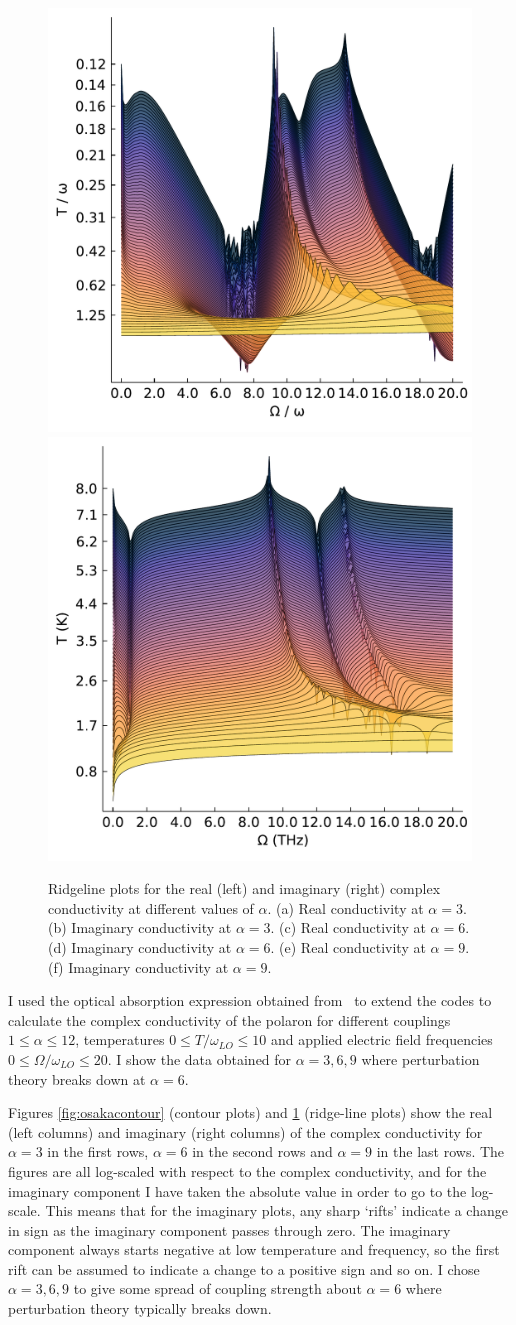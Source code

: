 \begin{figure}[p]
    \includegraphics[width=.49\textwidth]{figures/conductivity_plot_temp_real_9.pdf}
    \includegraphics[width=.49\textwidth]{figures/conductivity_plot_temp_imag_9.pdf}

    \caption{Ridgeline plots for the real (left) and imaginary (right) complex conductivity at different values of $\alpha$. (a) Real conductivity at $\alpha = 3$. (b) Imaginary conductivity at $\alpha = 3$. (c) Real conductivity at $\alpha = 6$. (d) Imaginary conductivity at $\alpha = 6$. (e) Real conductivity at $\alpha = 9$. (f) Imaginary conductivity at $\alpha = 9$.}
    \label{fig:osakaridge}
\end{figure}

I used the optical absorption expression obtained from~\cite{devreese_optical_1972} to extend the codes to calculate the complex conductivity of the polaron for different couplings $1 \leq \alpha \leq 12$, temperatures $0 \leq T / \omega_{LO} \leq 10$ and applied electric field frequencies $0 \leq \Omega / \omega_{LO} \leq 20$. I show the data obtained for $\alpha = 3, 6, 9$ where perturbation theory breaks down at $\alpha = 6$. 

Figures \ref{fig:osakacontour} (contour plots) and \ref{fig:osakaridge} (ridge-line plots) show the real (left columns) and imaginary (right columns) of the complex conductivity for $\alpha = 3$ in the first rows, $\alpha = 6$ in the second rows and $\alpha = 9$ in the last rows. The figures are all log-scaled with respect to the complex conductivity, and for the imaginary component I have taken the absolute value in order to go to the log-scale. This means that for the imaginary plots, any sharp `rifts' indicate a change in sign as the imaginary component passes through zero. The imaginary component always starts negative at low temperature and frequency, so the first rift can be assumed to indicate a change to a positive sign and so on. I chose $\alpha = 3, 6, 9$ to give some spread of coupling strength about $\alpha = 6$ where perturbation theory typically breaks down. 

